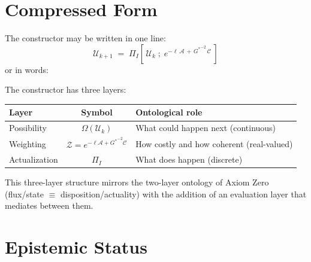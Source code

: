 \documentclass[11pt,a4paper]{article}
\newcommand{\UU}{\mathcal{U}}
\newcommand{\OO}{\Omega}
\newcommand{\PP}{\Pi}
\newcommand{\onticell}{\ell}
\theoremstyle{compact}
\begin{document}
\section{Compressed Form}
\label{sec:compressed}

The constructor may be written in one line:
\begin{equation}
\label{eq:compressed}
\boxed{
\UU_{k+1} \;=\; \PP_I\!\left[\,\UU_k \;;\; e^{-\onticell\,\mathcal{A} \,+\, {G^*}^{-2}\,\mathcal{C}}\,\right]
}
\end{equation}
or in words:
\begin{center}
\end{center}

\medskip

The constructor has three layers:
\begin{center}
\begin{tabular}{lcl}
\toprule
\textbf{Layer} & \textbf{Symbol} & \textbf{Ontological role} \\
\midrule
Possibility & $\OO(\UU_k)$ & What could happen next (continuous) \\
Weighting & $\mathcal{Z} = e^{-\onticell\mathcal{A} + {G^*}^{-2}\mathcal{C}}$ & How costly and how coherent (real-valued) \\
Actualization & $\PP_I$ & What does happen (discrete) \\
\bottomrule
\end{tabular}
\end{center}

This three-layer structure mirrors the two-layer ontology of Axiom Zero (flux/state $\equiv$ disposition/actuality) with the addition of an evaluation layer that mediates between them.


\section{Epistemic Status}
\label{sec:epistemic}
\end{document}
